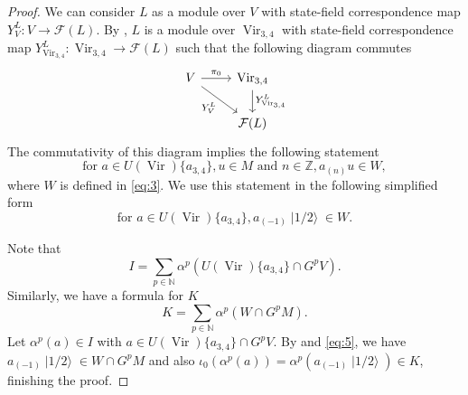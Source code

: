 \documentclass[a4paper, 12pt, reqno]{amsart}
\theoremstyle{remark}
\DeclareMathOperator{\Vir}{Vir}
\DeclareMathOperator{\vachalf}{|1/2\rangle}
\begin{document}
\begin{proof}
  We can consider $L$ as a module over $V$ with state-field correspondence map $Y^L_{V}: V \to \mathcal{F}(L)$.
  By \cite[Theorem 4.2]{wang_rationality_1993}, $L$ is a module over $\Vir_{3,4}$ with state-field correspondence map $Y^L_{\Vir_{3, 4}}: \Vir_{3, 4} \to \mathcal{F}(L)$ such that the following diagram commutes
  \begin{equation*}
    \begin{tikzcd}
      V \arrow[r, "\pi_0"] \arrow[rd, "{Y^{L}_{V}}"'] & {\Vir_{3, 4}} \arrow[d, "{Y^{L}_{\Vir_{3, 4}}}"] \\
      & {\mathcal{F}(L)}
    \end{tikzcd}
  \end{equation*}
  The commutativity of this diagram implies the following statement
  \begin{equation*}
    \text{for }a \in U(\Vir)\{a_{3, 4}\}, u \in M\text{ and }n \in \mathbb{Z}, a_{(n)}u \in W,
  \end{equation*}
  where $W$ is defined in \eqref{eq:3}.
  We use this statement in the following simplified form
  \begin{equation}
    \label{eq:5}
    \text{for }a \in U(\Vir)\{a_{3, 4}\}, a_{(-1)}\vachalf \in W.
  \end{equation}

  Note that
  \begin{equation*}
    I = \sum_{p \in \mathbb{N}}\alpha^p(U(\Vir)\{a_{3, 4}\} \cap G^pV).
  \end{equation*}
  Similarly, we have a formula for $K$
  \begin{equation*}
    K = \sum_{p \in \mathbb{N}}\alpha^p(W \cap G^pM).
  \end{equation*}
  Let $\alpha^p(a) \in I$ with $a \in U(\Vir)\{a_{3, 4}\} \cap G^pV$.
  By  and \eqref{eq:5}, we have $a_{(-1)}\vachalf \in W \cap G^pM$ and also $\iota_0(\alpha^p(a)) = \alpha^p(a_{(-1)}\vachalf) \in K$, finishing the proof.
\end{proof}
\end{document}
